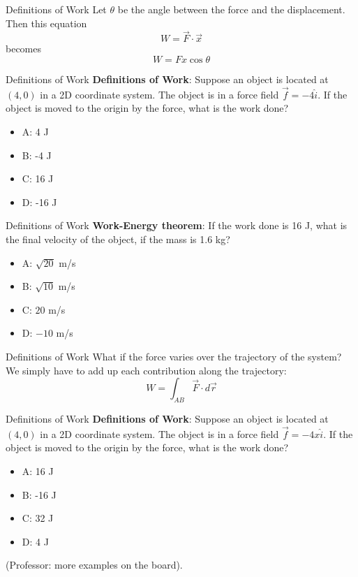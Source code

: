 \documentclass{beamer}
\begin{document}
\begin{frame}{Definitions of Work}
Let $\theta$ be the angle between the force and the displacement.  Then this equation
\begin{equation}
W = \vec{F} \cdot \vec{x}
\end{equation}
becomes
\begin{equation}
W = Fx\cos\theta
\end{equation}
\end{frame}

\begin{frame}{Definitions of Work}
\textbf{Definitions of Work}: Suppose an object is located at $(4,0)$ in a 2D coordinate system.  The object is in a force field $\vec{f} = -4 \hat{i}$.  If the object is moved to the origin by the force, what is the work done?
\begin{itemize}
\item A: 4 J
\item B: -4 J
\item C: 16 J
\item D: -16 J
\end{itemize}
\end{frame}

\begin{frame}{Definitions of Work}
\textbf{Work-Energy theorem}: If the work done is 16 J, what is the final velocity of the object, if the mass is 1.6 kg?
\begin{itemize}
\item A: $\sqrt{20}$ m/s
\item B: $\sqrt{10}$ m/s
\item C: $20$ m/s
\item D: $-10$ m/s
\end{itemize}
\end{frame}

\begin{frame}{Definitions of Work}
What if the force varies over the trajectory of the system?  We simply have to add up each contribution along the trajectory:
\begin{equation}
W = \int_{AB} \vec{F} \cdot d\vec{r}
\end{equation}
\end{frame}

\begin{frame}{Definitions of Work}
\textbf{Definitions of Work}: Suppose an object is located at $(4,0)$ in a 2D coordinate system.  The object is in a force field $\vec{f} = -4x \hat{i}$.  If the object is moved to the origin by the force, what is the work done?
\begin{itemize}
\item A: 16 J
\item B: -16 J
\item C: 32 J
\item D: 4 J
\end{itemize}
(Professor: more examples on the board).
\end{frame}
\end{document}
